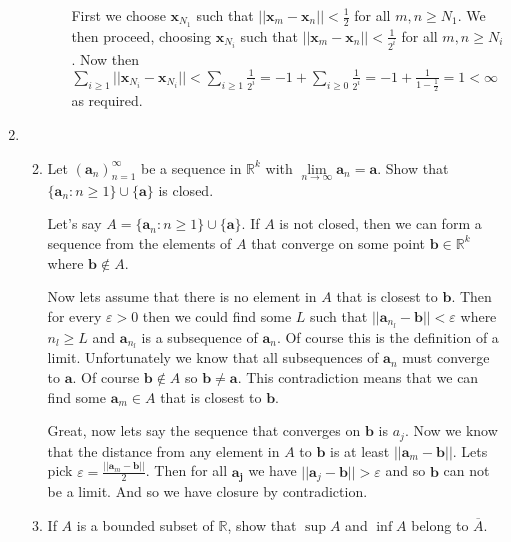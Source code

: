 \documentclass[letterpaper]{article}
\begin{document}
\begin{enumerate}
\begin{enumerate}
\begin{enumerate}
      First we choose $\boldsymbol{x}_{N_1}$ such that $||\boldsymbol{x}_m-\boldsymbol{x}_n||<\frac{1}{2}$ for all $m,n\ge N_1$.
      We then proceed, choosing $\boldsymbol{x}_{N_i}$ such that $||\boldsymbol{x}_m-\boldsymbol{x}_n||<\frac{1}{2^i}$ for all $m,n\ge N_i$.
      Now then $\sum_{i\ge1}||\boldsymbol{x}_{N_i}-\boldsymbol{x}_{N_i}||<\sum_{i\ge1}\frac{1}{2^i}=-1+\sum_{i\ge0}\frac{1}{2^i}=-1+\frac{1}{1-\frac{1}{2}}=1<\infty$ as required.
    \end{enumerate}
  \end{enumerate}
\item
  \begin{enumerate}
  \setcounter{enumii}{1}
  \item
    Let $(\boldsymbol{a}_n)_{n=1}^\infty$ be a sequence in $\mathbb{R}^k$ with $\lim\limits_{n\to\infty}\boldsymbol{a}_n=\boldsymbol{a}$. Show that $\{\boldsymbol{a}_n:n\ge 1\}\cup\{\boldsymbol{a}\}$ is closed.

    Let's say $A=\{\boldsymbol{a}_n:n\ge1\}\cup\{\boldsymbol{a}\}$.
    If $A$ is not closed, then we can form a sequence from the elements of $A$ that converge on some point $\boldsymbol{b}\in\mathbb{R}^k$ where $\boldsymbol{b}\not\in A$.

    Now lets assume that there is no element in $A$ that is closest to $\boldsymbol{b}$.
    Then for every $\varepsilon>0$ then we could find some $L$ such that $||\boldsymbol{a}_{n_l}-\boldsymbol{b}||<\varepsilon$ where $n_l\ge L$ and $\boldsymbol{a}_{n_l}$ is a subsequence of $\boldsymbol{a}_n$.
    Of course this is the definition of a limit.
    Unfortunately we know that all subsequences of $\boldsymbol{a}_n$ must converge to $\boldsymbol{a}$.
    Of course $\boldsymbol{b}\not\in A$ so $\boldsymbol{b}\ne \boldsymbol{a}$.
    This contradiction means that we can find some $\boldsymbol{a}_m\in A$ that is closest to $\boldsymbol{b}$.

    Great, now lets say the sequence that converges on $\boldsymbol{b}$ is $a_j$.
    Now we know that the distance from any element in $A$ to $\boldsymbol{b}$ is at least $||\boldsymbol{a}_m-\boldsymbol{b}||$.
    Lets pick $\varepsilon=\frac{||\boldsymbol{a}_m-\boldsymbol{b}||}{2}$.
    Then for all $\boldsymbol{a_j}$ we have $||\boldsymbol{a}_j-\boldsymbol{b}||>\varepsilon$ and so $\boldsymbol{b}$ can not be a limit.
    And so we have closure by contradiction.
  \setcounter{enumii}{3}
  \item
    If $A$ is a bounded subset of $\mathbb{R}$, show that $\sup A$ and $\inf A$ belong to $\overline{A}$.


\end{enumerate}
\end{enumerate}
\end{document}
